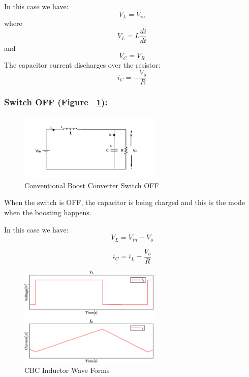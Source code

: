 In this case we have:
\begin{equation}
	V_L = V_{in}
	\label{eq:CBC_SWON1}
\end{equation}
where
\begin{equation}
	V_L = L \frac{di}{dt}
	\label{eq:CBC_SWON2}
\end{equation}
and
\begin{equation}
	V_C = V_R
	\label{eq:CBC_SWON3}
\end{equation}
The capacitor current discharges over the resistor:
\begin{equation}
	i_C = -\frac{V_o}{R}
	\label{eq:CBC_SWON4}
\end{equation}
\subsubsection{Switch OFF (Figure ~\ref{fig:CBC_OFF}):}

\begin{figure}[H]
   \centering
   \includegraphics[width=0.6\textwidth]{figures/aConventionalBoost/ConventionalBoostConverterOFF.pdf}
    \caption{Conventional Boost Converter Switch OFF}
	\label{fig:CBC_OFF}
\end{figure}

When the switch is OFF,
the capacitor is being charged and this is the mode when the boosting happens.

In this case we have:
\begin{equation}
	V_L = V_{in} - V_o
	\label{eq:CBC_SWOFF1}
\end{equation}

\begin{equation}
	i_C = i_L -\frac{V_o}{R}
	\label{eq:CBC_SWOFF2}
\end{equation}

\begin{figure}[H]
   \centering
   \includegraphics[width=0.6\textwidth]{figures/aConventionalBoost/LvAndLi.eps}
    \caption{CBC Inductor Wave Forms}
	\label{fig:CBC_InductorWaveForms}
\end{figure}

